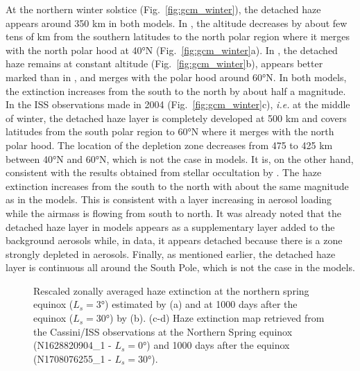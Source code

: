 At the northern winter solstice (Fig.~\ref{fig:gcm_winter}), the detached haze appears around 350 km in both models.
In \cite{Lebonnois2012}, the altitude decreases by about few tens of km from the southern latitudes to
the north polar region where it merges with the north polar hood at \ang{40}N (Fig.~\ref{fig:gcm_winter}a).
In \cite{Larson2015}, the detached haze remains at constant altitude (Fig.~\ref{fig:gcm_winter}b), appears better marked than in \cite{Lebonnois2012}, and merges with the polar hood around \ang{60}N.
In both models, the extinction increases from the south to the north by about half a magnitude.
In the ISS observations made in 2004 (Fig.~\ref{fig:gcm_winter}c), \emph{i.e.} at the middle of winter, the detached haze layer is completely developed at 500 km and covers latitudes from the south polar region to \ang{60}N where it merges with the north polar hood.
The location of the depletion zone decreases from 475 to 425 km between \ang{40}N and \ang{60}N, which is not the case in
models. It is, on the other hand, consistent with the results obtained from stellar occultation by \cite{Sicardy2006}.
The haze extinction increases from the south to the north with about the same magnitude as in the models. This
is consistent with a layer increasing in aerosol loading while the airmass is flowing from south to north. It was already
noted \citep{West2011, West2018} that the detached haze layer in models appears as a supplementary layer added to
the background aerosols while, in data, it appears detached because there is a zone strongly depleted in
aerosols. Finally, as mentioned earlier, the detached haze layer is continuous all around the South Pole, which is not
the case in the models.

\begin{figure*}[!ht]
\caption{Rescaled zonally averaged haze extinction at the northern spring equinox ($L_s = \ang{3}$)
estimated by \cite{Lebonnois2012} (a) and at 1000 days after the equinox ($L_s = \ang{30}$)
by \cite{Larson2015} (b).
(c-d) Haze extinction map retrieved from the Cassini/ISS observations
at the Northern Spring equinox (N1628820904\_1 - $L_s = \ang{0}$)
and 1000 days after the equinox (N1708076255\_1 - $L_s = \ang{30}$).}
\label{fig:gcm_spring}
\end{figure*}

